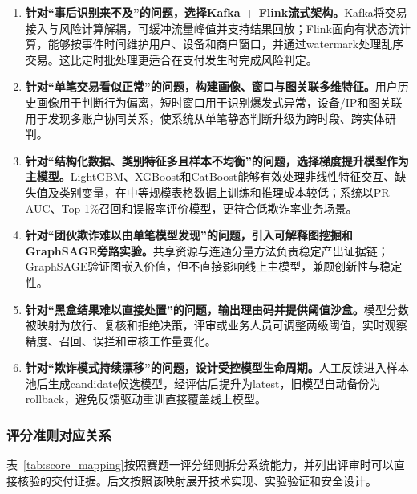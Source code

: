 \begin{enumerate}
  \item \textbf{针对“事后识别来不及”的问题，选择Kafka + Flink流式架构。}Kafka将交易接入与风险计算解耦，可缓冲流量峰值并支持结果回放；Flink面向有状态流计算，能够按事件时间维护用户、设备和商户窗口，并通过watermark处理乱序交易。这比定时批处理更适合在支付发生时完成风险判定。
  \item \textbf{针对“单笔交易看似正常”的问题，构建画像、窗口与图关联多维特征。}用户历史画像用于判断行为偏离，短时窗口用于识别爆发式异常，设备/IP和图关联用于发现多账户协同关系，使系统从单笔静态判断升级为跨时段、跨实体研判。
  \item \textbf{针对“结构化数据、类别特征多且样本不均衡”的问题，选择梯度提升模型作为主模型。}LightGBM、XGBoost和CatBoost能够有效处理非线性特征交互、缺失值及类别变量，在中等规模表格数据上训练和推理成本较低；系统以PR-AUC、Top 1\%召回和误报率评价模型，更符合低欺诈率业务场景。
  \item \textbf{针对“团伙欺诈难以由单笔模型发现”的问题，引入可解释图挖掘和GraphSAGE旁路实验。}共享资源与连通分量方法负责稳定产出证据链；GraphSAGE验证图嵌入价值，但不直接影响线上主模型，兼顾创新性与稳定性。
  \item \textbf{针对“黑盒结果难以直接处置”的问题，输出理由码并提供阈值沙盒。}模型分数被映射为放行、复核和拒绝决策，评审或业务人员可调整两级阈值，实时观察精度、召回、误拦和审核工作量变化。
  \item \textbf{针对“欺诈模式持续漂移”的问题，设计受控模型生命周期。}人工反馈进入样本池后生成candidate候选模型，经评估后提升为latest，旧模型自动备份为rollback，避免反馈驱动重训直接覆盖线上模型。
\end{enumerate}

\subsubsection{评分准则对应关系}

表~\ref{tab:score_mapping}按照赛题一评分细则拆分系统能力，并列出评审时可以直接核验的交付证据。后文按照该映射展开技术实现、实验验证和安全设计。

